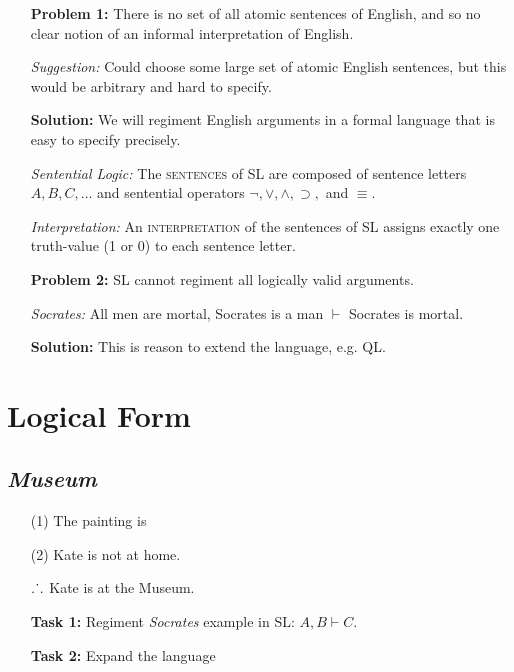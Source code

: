 \documentclass[a4paper, 11pt]{article} %
\def\therefore{\ensuremath{\ldotp\dot{}\,\ldotp}}
\begin{document}
\begin{enumerate}[leftmargin=1.2in,labelsep=.15in] %
  \item[\bf Problem 1:] There is no set of all atomic sentences of English, and so no clear notion of an informal interpretation of English.
  \item[\it Suggestion:] Could choose some large set of atomic English sentences, but this would be arbitrary and hard to specify.
  \item[\bf Solution:] We will regiment English arguments in a formal language that is easy to specify precisely.
  \item[\it Sentential Logic:] The \textsc{sentences} of SL are composed of sentence letters $A, B, C, \ldots$ and sentential operators $\neg,\vee,\wedge,\supset,$ and $\equiv$.
  \item[\it Interpretation:] An \textsc{interpretation} of the sentences of SL assigns exactly one truth-value (1 or 0) to each sentence letter.
  \item[\bf Problem 2:] SL cannot regiment all logically valid arguments.
  \item[\it Socrates:] All men are mortal, Socrates is a man $\vdash$ Socrates is mortal. 
  \item[\bf Solution:] This is reason to extend the language, e.g. QL.
\end{enumerate}




\section*{Logical Form}

\subsection*{\it \textbf{Museum}}

\begin{enumerate}
  \item[(1)] The painting is 
  \item[(2)] Kate is not at home.
  \item[\therefore] Kate is at the Museum.
\end{enumerate}

\begin{enumerate}[leftmargin=1.2in,labelsep=.15in] %
  \item[\bf Task 1:] Regiment \textit{Socrates} example in SL: $A, B \vdash C$.
  \item[\bf Task 2:] Expand the language
\end{enumerate}
\end{document}
